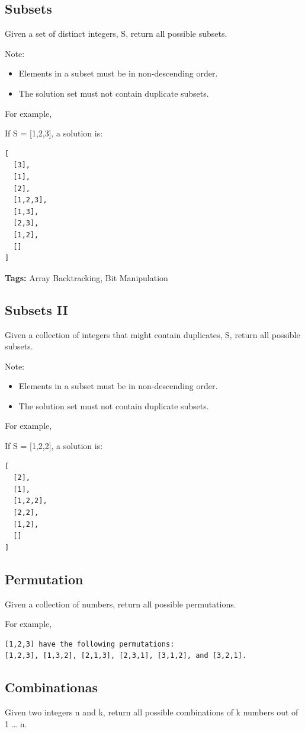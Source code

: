 \documentclass[12pt]{book}
\begin{document}
\subsection{Subsets}
\label{sec-9-1-1}
Given a set of distinct integers, S, return all possible subsets.

Note:
\begin{itemize}
\item Elements in a subset must be in non-descending order.
\item The solution set must not contain duplicate subsets.
\end{itemize}
For example,

If S = [1,2,3], a solution is:
\lstset{language=java,label= ,caption= ,numbers=none}
\begin{lstlisting}
[
  [3],
  [1],
  [2],
  [1,2,3],
  [1,3],
  [2,3],
  [1,2],
  []
]
\end{lstlisting}

\textbf{Tags:} Array Backtracking, Bit Manipulation
\subsection{Subsets II}
\label{sec-9-1-2}
Given a collection of integers that might contain duplicates, S, return all possible subsets.

Note:
\begin{itemize}
\item Elements in a subset must be in non-descending order.
\item The solution set must not contain duplicate subsets.
\end{itemize}
For example,

If S = [1,2,2], a solution is:
\lstset{language=java,label= ,caption= ,numbers=none}
\begin{lstlisting}
[
  [2],
  [1],
  [1,2,2],
  [2,2],
  [1,2],
  []
]
\end{lstlisting}
\subsection{Permutation}
\label{sec-9-1-3}
Given a collection of numbers, return all possible permutations.

For example,
\lstset{language=java,label= ,caption= ,numbers=none}
\begin{lstlisting}
[1,2,3] have the following permutations:
[1,2,3], [1,3,2], [2,1,3], [2,3,1], [3,1,2], and [3,2,1].
\end{lstlisting}
\subsection{Combinationas}
\label{sec-9-1-4}
Given two integers n and k, return all possible combinations of k numbers out of 1 \ldots{} n.
\end{document}

